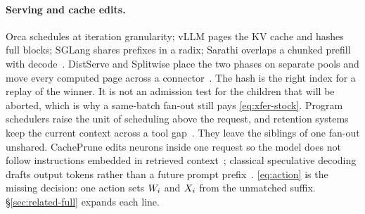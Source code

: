 \paragraph{Serving and cache edits.}
Orca schedules at iteration granularity; vLLM pages the KV cache and hashes full blocks; SGLang shares prefixes in a radix; Sarathi overlaps a chunked prefill with decode~\cite{orca,vllm,sglang,sarathi}.
DistServe and Splitwise place the two phases on separate pools and move every computed page across a connector~\cite{distserve,splitwise}.
The hash is the right index for a replay of the winner.
It is not an admission test for the children that will be aborted, which is why a same-batch fan-out still pays \eqref{eq:xfer-stock}.
Program schedulers raise the unit of scheduling above the request, and retention systems keep the current context across a tool gap~\cite{autellix,continuum,mori,forkkv}.
They leave the siblings of one fan-out unshared.
CachePrune edits neurons inside one request so the model does not follow instructions embedded in retrieved context~\cite{cacheprune}; classical speculative decoding drafts output tokens rather than a future prompt prefix~\cite{speculative,medusa}.
\eqref{eq:action} is the missing decision: one action sets $W_i$ and $X_i$ from the unmatched suffix.
\S\ref{sec:related-full} expands each line.
